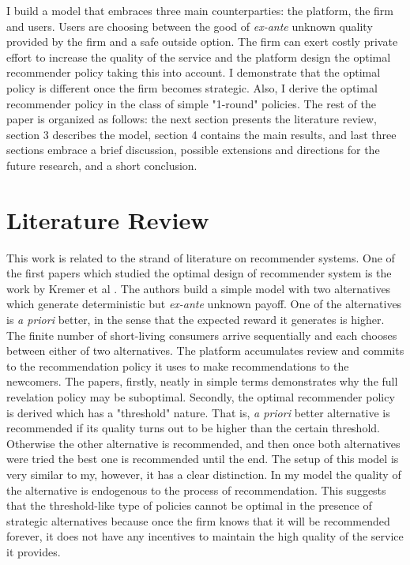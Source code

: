 \documentclass[a4paper]{article}
\begin{document}
	
	
	
	I build a model that embraces three main counterparties: the platform, the firm and users. Users are choosing between the good of \textit{ex-ante} unknown quality provided by the firm and a safe outside option. The firm can exert costly private effort to increase the quality of the service and the platform design the optimal recommender policy taking this into account. I demonstrate that the optimal policy is different once the firm becomes strategic. Also, I derive the optimal recommender policy in the class of simple "1-round" policies. The rest of the paper is organized as follows: the next section presents the literature review, section 3 describes the model, section 4 contains the main results, and last three sections embrace a brief discussion, possible extensions and directions for the future research, and a short conclusion.
	\section{Literature Review}
	This work is related to the strand of literature on recommender systems. One of the first papers which studied the optimal design of recommender system is the work by Kremer et al \cite{kremer2014}. The authors build a simple model with two alternatives which generate deterministic but \textit{ex-ante} unknown payoff. One of the alternatives is \textit{a priori} better, in the sense that the expected reward it generates is higher. The finite number of short-living consumers arrive sequentially and each chooses between either of two alternatives. The platform accumulates review and commits to the recommendation policy it uses to make recommendations to the newcomers. The papers, firstly, neatly in simple terms demonstrates why the full revelation policy may be suboptimal. Secondly, the optimal recommender policy is derived which has a "threshold" nature. That is, \textit{a priori} better alternative is recommended if its quality turns out to be higher than the certain threshold. Otherwise the other alternative is recommended, and then once both alternatives were tried the best one is recommended until the end. The setup of this model is very similar to my, however, it has a clear distinction. In my model the quality of the alternative is endogenous to the process of recommendation. This suggests that the threshold-like type of policies cannot be optimal in the presence of strategic alternatives because once the firm knows that it will be recommended forever, it does not have any incentives to maintain the high quality of the service it provides. 
	
\end{document}
